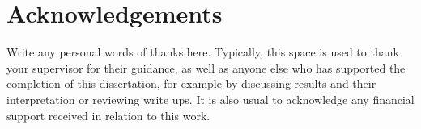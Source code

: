 \chapter*{Acknowledgements}

Write any personal words of thanks here.
Typically, this space is used to thank your supervisor for their guidance,
as well as anyone else who has supported the completion of this dissertation,
for example by discussing results and their interpretation or reviewing
write ups.
It is also usual to acknowledge any financial support received in relation to
this work.
